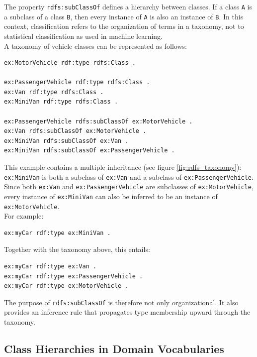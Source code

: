 \documentclass{scrbook}
\begin{document}
	The property \texttt{rdfs:subClassOf} defines a hierarchy between classes. If a class \texttt{A} is a subclass of a class \texttt{B}, then every instance of \texttt{A} is also an instance of \texttt{B}. In this context, classification refers to the organization of terms in a taxonomy, not to statistical classification as used in machine learning.\\
	
	A taxonomy of vehicle classes can be represented as follows:
	\begin{lstlisting}
ex:MotorVehicle rdf:type rdfs:Class .
		
ex:PassengerVehicle rdf:type rdfs:Class .
ex:Van rdf:type rdfs:Class .
ex:MiniVan rdf:type rdfs:Class .
		
ex:PassengerVehicle rdfs:subClassOf ex:MotorVehicle .
ex:Van rdfs:subClassOf ex:MotorVehicle .
ex:MiniVan rdfs:subClassOf ex:Van .
ex:MiniVan rdfs:subClassOf ex:PassengerVehicle .
	\end{lstlisting}
	
	This example contains a multiple inheritance (see figure \ref{fig:rdfs_taxonomy}): \texttt{ex:MiniVan} is both a subclass of \texttt{ex:Van} and a subclass of \texttt{ex:PassengerVehicle}. Since both \texttt{ex:Van} and \texttt{ex:PassengerVehicle} are subclasses of \texttt{ex:MotorVehicle}, every instance of \texttt{ex:MiniVan} can also be inferred to be an instance of \texttt{ex:MotorVehicle}.\\
	
	For example:
	
	\begin{lstlisting}
ex:myCar rdf:type ex:MiniVan .
	\end{lstlisting}
	
	Together with the taxonomy above, this entails:
	
	\begin{lstlisting}
ex:myCar rdf:type ex:Van .
ex:myCar rdf:type ex:PassengerVehicle .
ex:myCar rdf:type ex:MotorVehicle .
	\end{lstlisting}
	
	The purpose of \texttt{rdfs:subClassOf} is therefore not only organizational. It also provides an inference rule that propagates type membership upward through the taxonomy.
	
	\subsection{Class Hierarchies in Domain Vocabularies}
	
\end{document}
